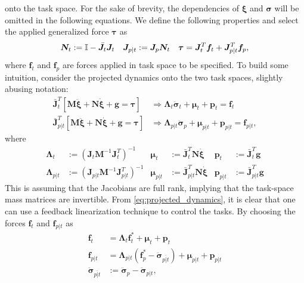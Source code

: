 onto the task space. For the sake of brevity, the dependencies of $\bm{\xi}$ and $\bm{\sigma}$
will be omitted in the following equations. We define the following properties and
select the applied generalized force $\bm{\tau}$ as
\begin{align}
    \bm{N}_t &:= \mathbb{I} - \bar{\bm{J}}_t \bm{J}_t &
    \bm{J}_{p|t} &:= \bm{J}_p \bm{N}_t &
    \bm{\tau} = \bm{J}_t^T \bm{f}_t + \bm{J}_{p|t}^T \bm{f}_p,
    \label{eq:force_application}
\end{align}
where $\bm{f}_t$ and $\bm{f}_p$ are forces applied in task space to be
specified. To build some intuition, consider the projected dynamics onto
the two task spaces, slightly abusing notation:
\begin{subequations}
    \label{eq:projected_dynamics}
\begin{align}
    \bar{\bm{J}}_t^T \left[
        \bm{M} \ddot{\bm{\xi}} + \bm{N} \dot{\bm{\xi}} + \bm{g} = \bm{\tau}
        \right]
    &\Rightarrow
    \bm{\Lambda}_t \ddot{\bm{\sigma}}_t + \bm{\mu}_t + \bm{p}_t = \bm{f}_t \\
    \bar{\bm{J}}_{p|t}^T \left[
        \bm{M} \ddot{\bm{\xi}} + \bm{N} \dot{\bm{\xi}} + \bm{g} = \bm{\tau}
        \right]
    &\Rightarrow
    \bm{\Lambda}_{p|t} \ddot{\bm{\sigma}}_p + \bm{\mu}_{p|t} + \bm{p}_{p|t} = \bm{f}_{p|t},
\end{align}
\end{subequations}
where
\begin{subequations}
\begin{align}
    \bm{\Lambda}_t &:= \left(\bm{J}_t \bm{M}^{-1} \bm{J}_t^T\right)^{-1} &
    \bm{\mu}_t &:= \bar{\bm{J}}_t^T \bm{N} \dot{\bm{\xi}} &
    \bm{p}_t &:= \bar{\bm{J}}_t^T \bm{g} \\
    \bm{\Lambda}_{p|t} &:= \left(\bm{J}_{p|t} \bm{M}^{-1} \bm{J}_{p|t}^T\right)^{-1} \label{eq:lambda_pIt} &
    \bm{\mu}_{p|t} &:= \bar{\bm{J}}_{p|t}^T \bm{N} \dot{\bm{\xi}} &
    \bm{p}_{p|t} &:= \bar{\bm{J}}_{p|t}^T \bm{g}
\end{align}
\end{subequations}
This is assuming that the Jacobians are full rank, implying that the task-space
mass matrices are invertible. From \autoref{eq:projected_dynamics}, it is clear
that one can use a feedback linearization technique to control the tasks. By
choosing the forces $\bm{f}_t$ and $\bm{f}_{p|t}$ as
\begin{subequations}
\begin{align}
    \bm{f}_t &= \bm{\Lambda}_t \bm{f}_t^* + \bm{\mu}_t + \bm{p}_t \\
    \bm{f}_{p|t} &= \bm{\Lambda}_{p|t} \left(\bm{f}_p^* - \ddot{\bm{\sigma}}_{\overline{p|t}}\right) + \bm{\mu}_{p|t} + \bm{p}_{p|t} \label{eq:osc_fp|t}\\
    \ddot{\bm{\sigma}}_{\overline{p|t}} &:= \ddot{\bm{\sigma}}_p - \ddot{\bm{\sigma}}_{p|t},
\end{align}
\end{subequations}
